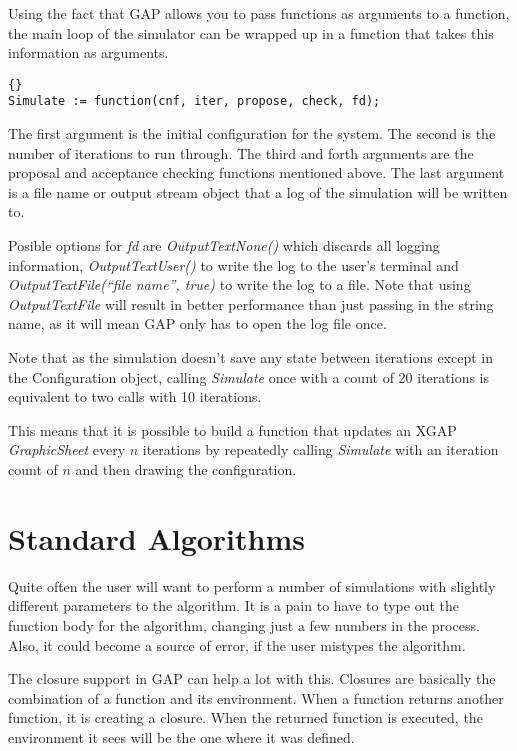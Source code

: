 \documentclass[12pt,a4paper]{book}  %
\begin{document}
Using the fact that GAP allows you to pass functions as arguments to a
function, the main loop of the simulator can be wrapped up in a
function that takes this information as arguments.

\begin{lstlisting}{}
Simulate := function(cnf, iter, propose, check, fd);
\end{lstlisting}

The first argument is the initial configuration for the system.  The
second is the number of iterations to run through.  The third and
forth arguments are the proposal and acceptance checking functions
mentioned above.  The last argument is a file name or output stream
object that a log of the simulation will be written to.

Posible options for \emph{fd} are \emph{OutputTextNone()} which
discards all logging information, \emph{OutputTextUser()} to write the
log to the user's terminal and \emph{OutputTextFile(``file name'',
true)} to write the log to a file.  Note that using
\emph{OutputTextFile} will result in better performance than just
passing in the string name, as it will mean GAP only has to open the
log file once.

Note that as the simulation doesn't save any state between iterations
except in the Configuration object, calling \emph{Simulate} once with
a count of 20 iterations is equivalent to two calls with 10
iterations.

This means that it is possible to build a function that updates an
XGAP \emph{GraphicSheet} every $n$ iterations by repeatedly calling
\emph{Simulate} with an iteration count of $n$ and then drawing the
configuration.

\section{Standard Algorithms}

Quite often the user will want to perform a number of simulations with
slightly different parameters to the algorithm.  It is a pain to have
to type out the function body for the algorithm, changing just a few
numbers in the process.  Also, it could become a source of error, if
the user mistypes the algorithm.

The closure support in GAP can help a lot with this.  Closures are
basically the combination of a function and its environment.  When a
function returns another function, it is creating a closure.  When the
returned function is executed, the environment it sees will be the one
where it was defined.
\end{document}

